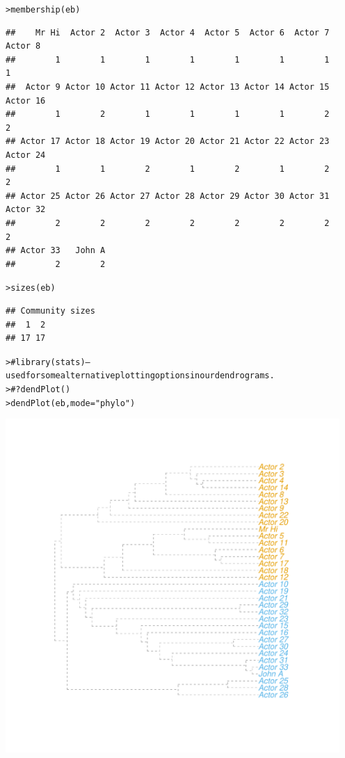 \documentclass[12pt]{article}\usepackage[]{graphicx}\usepackage[]{color}
\makeatletter
\newcommand{\hlstr}[1]{\textcolor[rgb]{0.82,0.78,0.62}{#1}}%
\newcommand{\hlcom}[1]{\textcolor[rgb]{0.404,0.408,0.42}{#1}}%
\newcommand{\hlstd}[1]{\textcolor[rgb]{0.882,0.878,0.898}{#1}}%
\newcommand{\hlkwc}[1]{\textcolor[rgb]{0.812,0.522,0.388}{#1}}%
\newcommand{\hlkwd}[1]{\textcolor[rgb]{0.733,0.388,0.812}{#1}}%
\newenvironment{kframe}{%
 \def\at@end@of@kframe{}%
 \ifinner\ifhmode%
  \def\at@end@of@kframe{\end{minipage}}%
  \begin{minipage}{\columnwidth}%
 \fi\fi%
 \def\FrameCommand##1{\hskip\@totalleftmargin \hskip-\fboxsep
 \colorbox{shadecolor}{##1}\hskip-\fboxsep
     \hskip-\linewidth \hskip-\@totalleftmargin \hskip\columnwidth}%
 \MakeFramed {\advance\hsize-\width
   \@totalleftmargin\z@ \linewidth\hsize
   \@setminipage}}%
 {\par\unskip\endMakeFramed%
 \at@end@of@kframe}
\newenvironment{knitrout}{}{} %
\makeatother
\begin{document}
\begin{flushleft}
\begin{center}
\begin{knitrout}
\begin{kframe}
\begin{alltt}
\hlstd{> }\hlkwd{membership}\hlstd{(eb)}
\end{alltt}
\begin{verbatim}
##    Mr Hi  Actor 2  Actor 3  Actor 4  Actor 5  Actor 6  Actor 7  Actor 8 
##        1        1        1        1        1        1        1        1 
##  Actor 9 Actor 10 Actor 11 Actor 12 Actor 13 Actor 14 Actor 15 Actor 16 
##        1        2        1        1        1        1        2        2 
## Actor 17 Actor 18 Actor 19 Actor 20 Actor 21 Actor 22 Actor 23 Actor 24 
##        1        1        2        1        2        1        2        2 
## Actor 25 Actor 26 Actor 27 Actor 28 Actor 29 Actor 30 Actor 31 Actor 32 
##        2        2        2        2        2        2        2        2 
## Actor 33   John A 
##        2        2
\end{verbatim}
\begin{alltt}
\hlstd{> }\hlkwd{sizes}\hlstd{(eb)}
\end{alltt}
\begin{verbatim}
## Community sizes
##  1  2 
## 17 17
\end{verbatim}
\begin{alltt}
\hlstd{> }\hlcom{# library(stats) -- used for some alternative plotting options in our dendrograms.}
\hlstd{> }\hlcom{# ?dendPlot()}
\hlstd{> }\hlkwd{dendPlot}\hlstd{(eb,} \hlkwc{mode} \hlstd{=} \hlstr{"phylo"}\hlstd{)}
\end{alltt}
\end{kframe}
\includegraphics[width=5in]{figure/Assort-3} 

\end{knitrout}
\end{center}
\end{flushleft}
\end{document}
